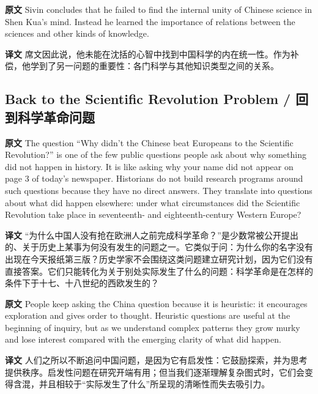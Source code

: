 \documentclass[UTF8,zihao=-4]{ctexart}
\newcommand{\BodyFont}{\fontsize{10.5pt}{15.5pt}\selectfont}
\newcommand{\origlabel}{\textbf{原文}\quad}
\newcommand{\translabel}{\textbf{译文}\quad}
\newenvironment{enblock}{\par\noindent\begingroup\BodyFont\origlabel}{\par\endgroup}
\newenvironment{zhblock}{\par\noindent\begingroup\BodyFont\translabel}{\par\endgroup\vspace{0.35em}}
\begin{document}
\begin{enblock}
Sivin concludes that he failed to find the internal unity of Chinese science in Shen Kua's mind. Instead he learned the importance of relations between the sciences and other kinds of knowledge.
\end{enblock}
\begin{zhblock}
席文因此说，他未能在沈括的心智中找到中国科学的内在统一性。作为补偿，他学到了另一问题的重要性：各门科学与其他知识类型之间的关系。
\end{zhblock}

\subsection*{Back to the Scientific Revolution Problem / 回到科学革命问题}

\begin{enblock}
The question ``Why didn't the Chinese beat Europeans to the Scientific Revolution?'' is one of the few public questions people ask about why something did not happen in history. It is like asking why your name did not appear on page 3 of today's newspaper. Historians do not build research programs around such questions because they have no direct answers. They translate into questions about what did happen elsewhere: under what circumstances did the Scientific Revolution take place in seventeenth- and eighteenth-century Western Europe?
\end{enblock}
\begin{zhblock}
“为什么中国人没有抢在欧洲人之前完成科学革命？”是少数常被公开提出的、关于历史上某事为何没有发生的问题之一。它类似于问：为什么你的名字没有出现在今天报纸第三版？历史学家不会围绕这类问题建立研究计划，因为它们没有直接答案。它们只能转化为关于别处实际发生了什么的问题：科学革命是在怎样的条件下于十七、十八世纪的西欧发生的？
\end{zhblock}

\begin{enblock}
People keep asking the China question because it is heuristic: it encourages exploration and gives order to thought. Heuristic questions are useful at the beginning of inquiry, but as we understand complex patterns they grow murky and lose interest compared with the emerging clarity of what did happen.
\end{enblock}
\begin{zhblock}
人们之所以不断追问中国问题，是因为它有启发性：它鼓励探索，并为思考提供秩序。启发性问题在研究开端有用；但当我们逐渐理解复杂图式时，它们会变得含混，并且相较于“实际发生了什么”所呈现的清晰性而失去吸引力。
\end{zhblock}
\end{document}
